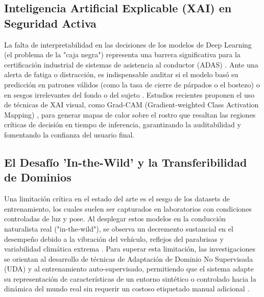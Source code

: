 \subsection{Inteligencia Artificial Explicable (XAI) en Seguridad Activa}
La falta de interpretabilidad en las decisiones de los modelos de Deep Learning (el problema de la "caja negra") representa una barrera significativa para la certificación industrial de sistemas de asistencia al conductor (ADAS) \cite{le2025redlight, silva2025light}. Ante una alerta de fatiga o distracción, es indispensable auditar si el modelo basó su predicción en patrones válidos (como la tasa de cierre de párpados o el bostezo) o en sesgos irrelevantes del fondo o del sujeto \cite{oussouaddi2025dsryolo, abukhadrah2025droneassisted}. Estudios recientes proponen el uso de técnicas de XAI visual, como Grad-CAM (Gradient-weighted Class Activation Mapping) \cite{deshpande2025computervision, elhenidy2025gyyolo}, para generar mapas de calor sobre el rostro que resaltan las regiones críticas de decisión en tiempo de inferencia, garantizando la auditabilidad y fomentando la confianza del usuario final.

\subsection{El Desafío 'In-the-Wild' y la Transferibilidad de Dominios}
Una limitación crítica en el estado del arte es el sesgo de los datasets de entrenamiento, los cuales suelen ser capturados en laboratorios con condiciones controladas de luz y pose. Al desplegar estos modelos en la conducción naturalista real ("in-the-wild"), se observa un decremento sustancial en el desempeño debido a la vibración del vehículo, reflejos del parabrisas y variabilidad climática extrema \cite{lu2024validation, khattak2024role}. Para superar esta limitación, las investigaciones se orientan al desarrollo de técnicas de Adaptación de Dominio No Supervisada (UDA) \cite{barbu2025deep, yadav2025enhancing} y al entrenamiento auto-supervisado, permitiendo que el sistema adapte su representación de características de un entorno sintético o controlado hacia la dinámica del mundo real sin requerir un costoso etiquetado manual adicional \cite{chouhan2025deep, singh2025realtime}.
